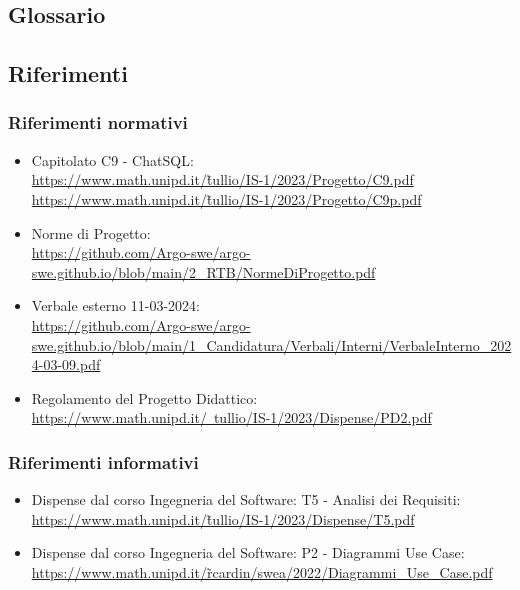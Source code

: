 \subsection{Glossario}
\GlossarioIntroduzione

\subsection{Riferimenti}
\subsubsection{Riferimenti normativi}
\begin{itemize}
  \item Capitolato C9 - ChatSQL:\\ \href{https://www.math.unipd.it/~tullio/IS-1/2023/Progetto/C9.pdf}{https://www.math.unipd.it/\~tullio/IS-1/2023/Progetto/C9.pdf} \\ \href{https://www.math.unipd.it/~tullio/IS-1/2023/Progetto/C9.pdf}{https://www.math.unipd.it/\~tullio/IS-1/2023/Progetto/C9p.pdf}
  \item Norme di Progetto:\\ \href{https://github.com/Argo-swe/argo-swe.github.io/blob/main/2_RTB/NormeDiProgetto.pdf}{https://github.com/Argo-swe/argo-swe.github.io/blob/main/2\_RTB/NormeDiProgetto.pdf}
  \item Verbale esterno 11-03-2024:\\ \href{https://github.com/Argo-swe/argo-swe.github.io/blob/main/1_Candidatura/Verbali/Interni/VerbaleInterno_2024-03-09.pdf}{https://github.com/Argo-swe/argo-swe.github.io/blob/main/1\_Candidatura/Verbali/Interni/VerbaleInterno\_2024-03-09.pdf}
  \item Regolamento del Progetto Didattico:\\ \href{https://www.math.unipd.it/~tullio/IS-1/2023/Dispense/PD2.pdf}{https://www.math.unipd.it/~tullio/IS-1/2023/Dispense/PD2.pdf}
\end{itemize}

\subsubsection{Riferimenti informativi}
\begin{itemize}
  \item Dispense dal corso Ingegneria del Software: T5 - Analisi dei Requisiti:\\ \href{https://www.math.unipd.it/~tullio/IS-1/2023/Dispense/T5.pdf}{https://www.math.unipd.it/\~tullio/IS-1/2023/Dispense/T5.pdf}
  \item Dispense dal corso Ingegneria del Software: P2 - Diagrammi Use Case:\\ \href{https://www.math.unipd.it/~rcardin/swea/2022/Diagrammi%20Use%20Case.pdf}{https://www.math.unipd.it/\~rcardin/swea/2022/Diagrammi\_Use\_Case.pdf}
\end{itemize}
